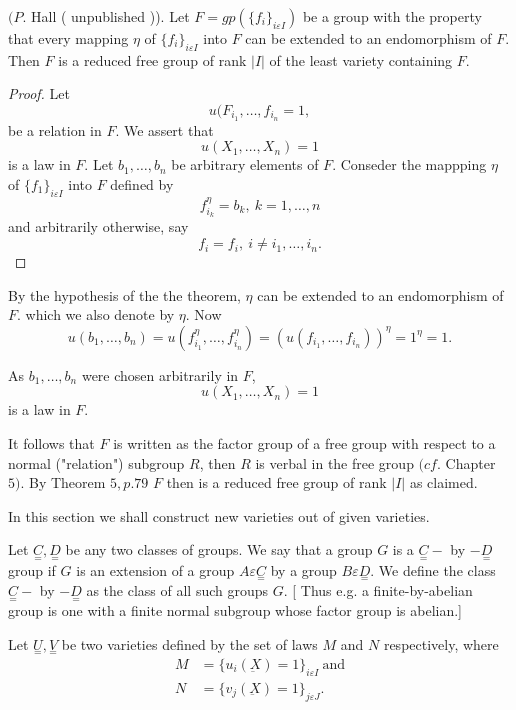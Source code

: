 \begin{Theorem}%
  $(P$. Hall ( unpublished )). Let $F = gp ( \big\{ f_i \big \}_{i
    \varepsilon I})$ be a group with the property that every mapping
  $\eta$ of $ \big \{ f_i \big \}_{i \varepsilon I} $ into $F$ can be
  extended to an endomorphism of $F$. Then $F$ is a reduced free group
  of rank $|I|$ of the least variety containing $F$.  
\end{Theorem}

\begin{proof}
  Let
  $$
  u(F_{i_{1}}, \ldots, f_{i_{n}} = 1,
  $$
  be a relation in $F$. We assert that 
  $$
  u(X_1, \ldots,X_n) = 1
  $$
  is a law in $F$. Let $b_1, \ldots,b_n$ be arbitrary elements of
  $F$. Conseder the mappping $\eta$ of $\big\{ f_1 \big\}_{i
    \varepsilon I}$ into $F$ defined by 
  $$
  f^\eta_{i_{k}} = b_k, ~ k = 1,\ldots,n
  $$
  and arbitrarily otherwise, say
  $$
  f_i = f_i, ~ i \neq i_1, \ldots,i_n. 
  $$
\end{proof}

By the hypothesis  of the the theorem, $\eta$ can be extended to an
endomorphism of $F$. which we also denote by  $\eta$. Now 
$$
u(b_1,\ldots,b_n) = u(f^\eta_{i_{1}},\ldots,f^\eta_{i_{n}}) = (u
(f_{i_{1}},\ldots,f_{i_{n}} ))^\eta = 1^\eta = 1. 
$$

As $b_1,\ldots,b_n$ were chosen arbitrarily in $F$,
$$
u(X_1,\ldots,X_n) = 1
$$
is a law in $F$.

It follows that $F$ is written as the factor group of a free group
with respect to a normal ("relation") subgroup $R$, then $R$ is verbal
in the free group $(cf$. Chapter $5)$. By Theorem $5,p.79 $ $F$ then
is a reduced free group of rank $|I|$ as claimed. 

In this section we shall construct new varieties out of given varieties.

Let $\underset{=}{C}, \underset{=}{D}$ be any two classes of
groups. We say that a group $G$ is a $\underset{=}{C}-$ by
$-\underset{=}{D}$ group if $G$ is an extension of a group $A
\varepsilon \underset{=}{C}$ by a group $B \varepsilon
\underset{=}{D}$. We define the class $\underset{=}{C}-$ by
$-\underset{=}{D}$ as the class of all such groups $G$. [ Thus e.g. a
  finite-by-abelian group  is one with a finite normal subgroup whose
  factor group is abelian.]  

Let $\underset{=}{U},\underset{=}{V}$ be two varieties defined by the
set of laws $M$ and $N$ respectively, where 
\begin{align*}
  M &= \big\{ u_i (\underbar{X}) = 1 \big \}_{i \varepsilon I} ~  \text{and} \\
  N &=  \big\{ v_j (\underbar{X}) = 1 \big\}_{j \varepsilon J}.
 \end{align*} 
 

